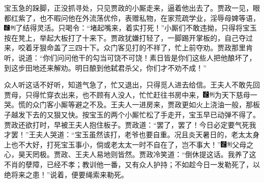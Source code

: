 宝玉急的跺脚，正没抓寻处，只见贾政的小厮走来，逼着他出去了。贾政一见，眼都红紫了，也不暇问他在外流荡优伶，表赠私物，在家荒疏学业，淫辱母婢等语，{\includegraphics[width=3mm]{../Images/00006}\includegraphics[width=3mm]{../Images/00011}\footnotesize \kaishu 了结得灵活。}只喝令：``堵起嘴来，着实打死！''小厮们不敢违拗，只得将宝玉按在凳上，举起大板打了十来下。贾政犹嫌打轻了，一脚踢开掌板的，自己夺过来，咬着牙狠命盖了三四十下。众门客见打的不祥了，忙上前夺劝。贾政那里肯听，说道：``你们问问他干的勾当可饶不可饶！素日皆是你们这些人把他酿坏了，到这步田地还来解劝。明日酿到他弑君杀父，你们才不劝不成！''

众人听这话不好听，知道气急了，忙又退出，只得觅人进去给信。王夫人不敢先回贾母，只得忙穿衣出来，也不顾有人没人，忙忙赶往书房中来，{\includegraphics[width=3mm]{../Images/00006}\includegraphics[width=3mm]{../Images/00011}\footnotesize \kaishu 为天下慈母一哭。}慌的众门客小厮等避之不及。王夫人一进房来，贾政更如火上浇油一般，那板子越发下去的又狠又快。按宝玉的两个小厮忙松了手走开，宝玉早已动弹不得了。贾政还欲打时，早被王夫人抱住板子。贾政道：``罢了，罢了！今日必定要气死我才罢！''王夫人哭道：``宝玉虽然该打，老爷也要自重。况且炎天暑日的，老太太身上也不大好，打死宝玉事小，倘或老太太一时不自在了，岂不事大！''{\includegraphics[width=3mm]{../Images/00006}\includegraphics[width=3mm]{../Images/00011}\footnotesize \kaishu 父母之心，昊天罔极。贾政、王夫人易地则皆然。}贾政冷笑道：``倒休提这话。我养了这不肖的孽障，已经不孝；教训他一番，又有众人护持；不如趁今日一发勒死了，以绝将来之患！''说着，便要绳索来勒死。

